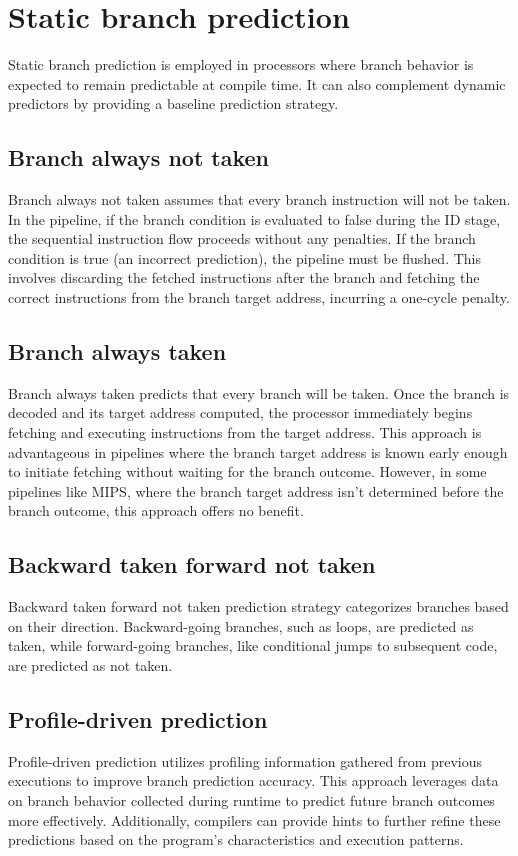 \section{Static branch prediction}

Static branch prediction is employed in processors where branch behavior is expected to remain predictable at compile time.
It can also complement dynamic predictors by providing a baseline prediction strategy.

\subsection{Branch always not taken}
Branch always not taken assumes that every branch instruction will not be taken.
In the pipeline, if the branch condition is evaluated to false during the ID stage, the sequential instruction flow proceeds without any penalties. 
If the branch condition is true (an incorrect prediction), the pipeline must be flushed. 
This involves discarding the fetched instructions after the branch and fetching the correct instructions from the branch target address, incurring a one-cycle penalty.

\subsection{Branch always taken}
Branch always taken predicts that every branch will be taken.
Once the branch is decoded and its target address computed, the processor immediately begins fetching and executing instructions from the target address. 
This approach is advantageous in pipelines where the branch target address is known early enough to initiate fetching without waiting for the branch outcome.
However, in some pipelines like MIPS, where the branch target address isn't determined before the branch outcome, this approach offers no benefit.

\subsection{Backward taken forward not taken}
Backward taken forward not taken prediction strategy categorizes branches based on their direction. 
Backward-going branches, such as loops, are predicted as taken, while forward-going branches, like conditional jumps to subsequent code, are predicted as not taken.

\subsection{Profile-driven prediction}
Profile-driven prediction utilizes profiling information gathered from previous executions to improve branch prediction accuracy. 
This approach leverages data on branch behavior collected during runtime to predict future branch outcomes more effectively. 
Additionally, compilers can provide hints to further refine these predictions based on the program's characteristics and execution patterns.

